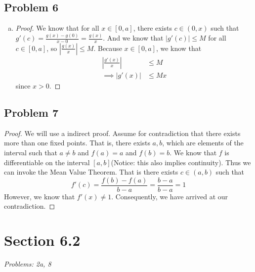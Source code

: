 \documentclass[12pt]{article}
\begin{document}
\subsection*{Problem 6}
\begin{enumerate}[a).]
    \item {
        \begin{proof}
            We know that for all $x \in [0,a]$, there exists $c \in (0,x)$ such that $g'(c) = \frac{g(x) - g(0)}{x-0} = \frac{g(x)}{x}$.
            And we know that $|g'(c)| \le M$ for all $c \in [0,a]$, so $|\frac{g(x)}{x}| \le M$.
            Because $x \in [0,a]$, we know that 
            \begin{align*}
                \left| \frac{g'(x)}{x} \right| &\le M \\
                \implies \left| g'(x)\right| &\le Mx
            \end{align*}
            since $x> 0$.
        \end{proof}
    }
\end{enumerate}

\subsection*{Problem 7}
\begin{proof}
    We will use a indirect proof. 
    Assume for contradiction that there exists more than one fixed points. 
    That is, there exists $a, b$, which are elements of the interval such that $a \ne b$ and $f(a) = a$ and $f(b) = b$. 
    We know that $f$ is differentiable on the interval $[a,b]$(Notice: this also implies continuity).
    Thus we can invoke the Mean Value Theorem.
    That is there exists $c \in (a,b)$ such that 
    $$f'(c) = \frac{f(b) - f(a)}{b - a} = \frac{b - a}{ b - a} = 1$$
    However, we know that $f'(x) \ne 1$.
    Consequently, we have arrived at our contradiction.
\end{proof}


\vspace*{1cm}


\section*{Section 6.2}
\textit{Problems: 2a, 8}
\end{document}
